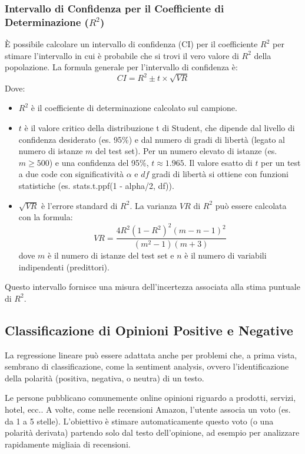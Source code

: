 \documentclass{article}
\begin{document}
\subsubsection{Intervallo di Confidenza per il Coefficiente di Determinazione ($R^2$)}
È possibile calcolare un intervallo di confidenza (CI) per il coefficiente $R^2$ per stimare l'intervallo in cui è probabile che si trovi il vero valore di $R^2$ della popolazione. La formula generale per l'intervallo di confidenza è:
$$ CI = R^2 \pm t \times \sqrt{VR} $$
Dove:
\begin{itemize}
    \item $R^2$ è il coefficiente di determinazione calcolato sul campione.
    \item $t$ è il valore critico della distribuzione t di Student, che dipende dal livello di confidenza desiderato (es. 95\%) e dal numero di gradi di libertà (legato al numero di istanze $m$ del test set). Per un numero elevato di istanze (es. $m \ge 500$) e una confidenza del 95\%, $t \approx 1.965$. Il valore esatto di $t$ per un test a due code con significatività $\alpha$ e $df$ gradi di libertà si ottiene con funzioni statistiche (es. stats.t.ppf(1 - alpha/2, df)).
    \item $\sqrt{VR}$ è l'errore standard di $R^2$. La varianza $VR$ di $R^2$ può essere calcolata con la formula:
          $$ VR = \frac{4 R^2 (1-R^2)^2 (m-n-1)^2}{(m^2-1)(m+3)} $$
          dove $m$ è il numero di istanze del test set e $n$ è il numero di variabili indipendenti (predittori).
\end{itemize}
Questo intervallo fornisce una misura dell'incertezza associata alla stima puntuale di $R^2$.

\subsection{Classificazione di Opinioni Positive e Negative}
La regressione lineare può essere adattata anche per problemi che, a prima vista, sembrano di classificazione, come la sentiment analysis, ovvero l'identificazione della polarità (positiva, negativa, o neutra) di un testo.

Le persone pubblicano comunemente online opinioni riguardo a prodotti, servizi, hotel, ecc.. A volte, come nelle recensioni Amazon, l'utente associa un voto (es. da 1 a 5 stelle). L'obiettivo è stimare automaticamente questo voto (o una polarità derivata) partendo solo dal testo dell'opinione, ad esempio per analizzare rapidamente migliaia di recensioni.
\end{document}
